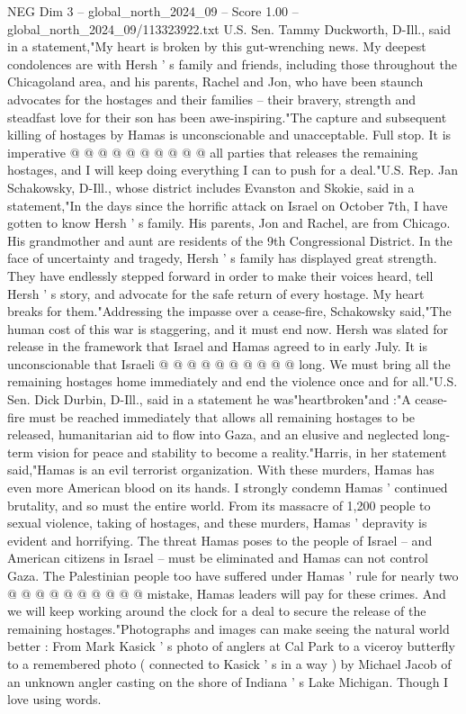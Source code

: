 \begin{textsample}{NEG Dim 3 – global\_north\_2024\_09 – Score 1.00 – global\_north\_2024\_09/113323922.txt}
U.S.
Sen.
Tammy Duckworth, D-Ill., said in a statement,"My heart is broken by this gut-wrenching news.
My deepest condolences are with Hersh ' s family and friends, including those throughout the Chicagoland area, and his parents, Rachel and Jon, who have been staunch advocates for the hostages and their families -- their bravery, strength and steadfast love for their son has been awe-inspiring."The capture and subsequent killing of hostages by Hamas is unconscionable and unacceptable.
Full stop.
It is imperative @ @ @ @ @ @ @ @ @ @ all parties that releases the remaining hostages, and I will keep doing everything I can to push for a deal."U.S.
Rep.
Jan Schakowsky, D-Ill., whose district includes Evanston and Skokie, said in a statement,"In the days since the horrific attack on Israel on October 7th, I have gotten to know Hersh ' s family.
His parents, Jon and Rachel, are from Chicago.
His grandmother and aunt are residents of the 9th Congressional District.
In the face of uncertainty and tragedy, Hersh ' s family has displayed great strength.
They have endlessly stepped forward in order to make their voices heard, tell Hersh ' s story, and advocate for the safe return of every hostage.
My heart breaks for them."Addressing the impasse over a cease-fire, Schakowsky said,"The human cost of this war is staggering, and it must end now.
Hersh was slated for release in the framework that Israel and Hamas agreed to in early July.
It is unconscionable that Israeli @ @ @ @ @ @ @ @ @ @ long.
We must bring all the remaining hostages home immediately and end the violence once and for all."U.S.
Sen.
Dick Durbin, D-Ill., said in a statement he was"heartbroken"and :"A cease-fire must be reached immediately that allows all remaining hostages to be released, humanitarian aid to flow into Gaza, and an elusive and neglected long-term vision for peace and stability to become a reality."Harris, in her statement said,"Hamas is an evil terrorist organization.
With these murders, Hamas has even more American blood on its hands.
I strongly condemn Hamas ' continued brutality, and so must the entire world.
From its massacre of 1,200 people to sexual violence, taking of hostages, and these murders, Hamas ' depravity is evident and horrifying.
The threat Hamas poses to the people of Israel -- and American citizens in Israel -- must be eliminated and Hamas can not control Gaza.
The Palestinian people too have suffered under Hamas ' rule for nearly two @ @ @ @ @ @ @ @ @ @ mistake, Hamas leaders will pay for these crimes.
And we will keep working around the clock for a deal to secure the release of the remaining hostages."Photographs and images can make seeing the natural world better : From Mark Kasick ' s photo of anglers at Cal Park to a viceroy butterfly to a remembered photo ( connected to Kasick ' s in a way ) by Michael Jacob of an unknown angler casting on the shore of Indiana ' s Lake Michigan.
Though I love using words.

\end{textsample}
